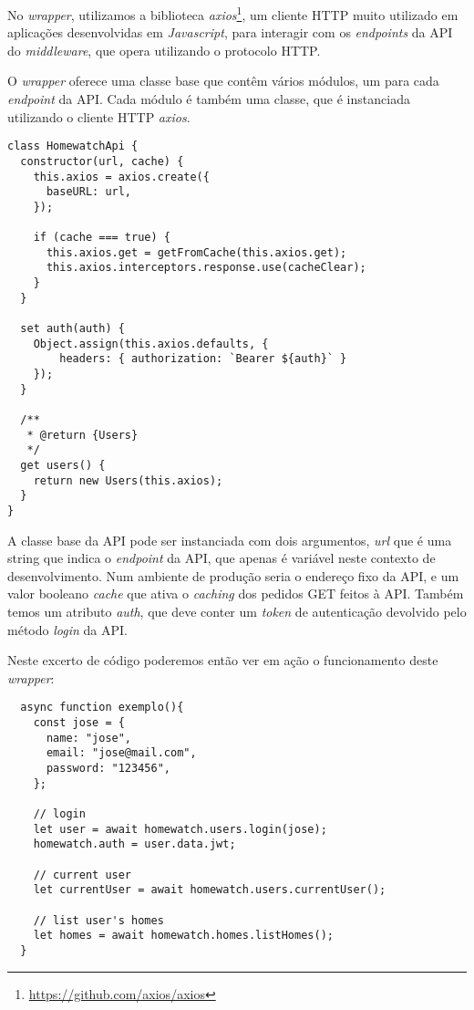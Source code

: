 No \textit{wrapper}, utilizamos a biblioteca \textit{axios}\footnote{\url{https://github.com/axios/axios}}, um cliente HTTP muito utilizado em aplicações desenvolvidas em \textit{Javascript}, para interagir com os \textit{endpoints} da API do \textit{middleware}, que opera utilizando o protocolo HTTP.

O \textit{wrapper} oferece uma classe base que contêm vários módulos, um para cada \textit{endpoint} da API. Cada módulo é também uma classe, que é instanciada utilizando o cliente HTTP \textit{axios}.

\begin{verbatim}
class HomewatchApi {
  constructor(url, cache) {
    this.axios = axios.create({
      baseURL: url,
    });

    if (cache === true) {
      this.axios.get = getFromCache(this.axios.get);
      this.axios.interceptors.response.use(cacheClear);
    }
  }

  set auth(auth) {
    Object.assign(this.axios.defaults, { 
        headers: { authorization: `Bearer ${auth}` } 
    });
  }
  
  /**
   * @return {Users}
   */
  get users() {
    return new Users(this.axios);
  }
}
\end{verbatim}

A classe base da API pode ser instanciada com dois argumentos, \textit{url} que é uma string que indica o \textit{endpoint} da API, que apenas é variável neste contexto de desenvolvimento. Num ambiente de produção seria o endereço fixo da API, e um valor booleano \textit{cache} que ativa o \textit{caching} dos pedidos GET feitos à API. Também temos um atributo \textit{auth}, que deve conter um \textit{token} de autenticação devolvido pelo método \textit{login} da API.

Neste excerto de código poderemos então ver em ação o funcionamento deste \textit{wrapper}:

\begin{verbatim}
  async function exemplo(){
    const jose = {
      name: "jose",
      email: "jose@mail.com",
      password: "123456",
    };
    
    // login
    let user = await homewatch.users.login(jose);
    homewatch.auth = user.data.jwt;

    // current user
    let currentUser = await homewatch.users.currentUser();

    // list user's homes
    let homes = await homewatch.homes.listHomes();
  }
\end{verbatim}

